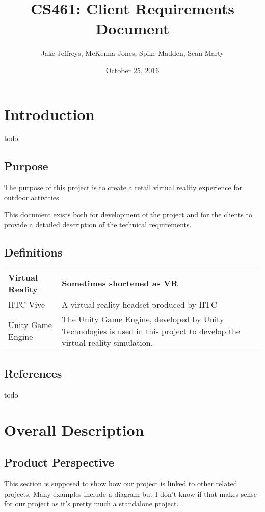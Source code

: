 \documentclass[10pt, oneside,onecolumn,draftclsnofoot]{IEEEtran}
\title{CS461: Client Requirements Document}
\author{Jake Jeffreys, McKenna Jones, Spike Madden, Sean Marty}
\date{October 25, 2016}
\begin{document}
\begin{titlepage}
\maketitle
\vspace{3cm}

\end{titlepage}

\tableofcontents
\section{Introduction}
todo
\subsection{Purpose}
The purpose of this project is to create a retail virtual reality experience for outdoor activities.

This document exists both for development of the project and for the clients
to provide a detailed description of the technical requirements.
\subsection{Definitions}
\begin{center}
	\begin{tabular}{| m{3cm} | m{9cm} |}
		\hline
		Virtual Reality & Sometimes shortened as VR \\
		\hline
		HTC Vive & A virtual reality headset produced by HTC \\
		\hline
		Unity Game Engine & The Unity Game Engine, developed by Unity Technologies is used in this project to develop the virtual reality simulation.
		\end{tabular}
\end{center}
\subsection{References}
todo

\section{Overall Description}
\subsection{Product Perspective}
This section is supposed to show how our project is linked to other related
projects. Many examples include a diagram but I don't know if that makes
sense for our project as it's pretty much a standalone project.
\end{document}
